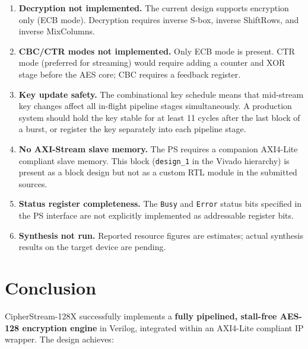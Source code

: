 \documentclass[12pt,a4paper]{article}
\begin{document}
\begin{enumerate}
  \item \textbf{Decryption not implemented.} The current design supports
        encryption only (ECB mode). Decryption requires inverse S-box,
        inverse ShiftRows, and inverse MixColumns.

  \item \textbf{CBC/CTR modes not implemented.} Only ECB mode is present.
        CTR mode (preferred for streaming) would require adding a counter and
        XOR stage before the AES core; CBC requires a feedback register.

  \item \textbf{Key update safety.} The combinational key schedule means that
        mid-stream key changes affect all in-flight pipeline stages
        simultaneously. A production system should hold the key stable for
        at least 11 cycles after the last block of a burst, or register the
        key separately into each pipeline stage.

  \item \textbf{No AXI-Stream slave memory.} The PS requires a companion
        AXI4-Lite compliant slave memory. This block (\texttt{design\_1} in
        the Vivado hierarchy) is present as a block design but not as a
        custom RTL module in the submitted sources.

  \item \textbf{Status register completeness.} The \texttt{Busy} and
        \texttt{Error} status bits specified in the PS interface are not
        explicitly implemented as addressable register bits.

  \item \textbf{Synthesis not run.} Reported resource figures are estimates;
        actual synthesis results on the target device are pending.
\end{enumerate}

\section{Conclusion}

CipherStream-128X successfully implements a \textbf{fully pipelined,
stall-free AES-128 encryption engine} in Verilog, integrated within an
AXI4-Lite compliant IP wrapper. The design achieves:
\end{document}
